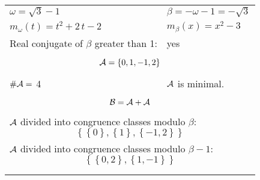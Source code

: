 \begin{exmp}
\label{ex:compareAJ}


\rule{0cm}{0cm}

\begin{tabular}{ll}
$\omega=  \sqrt{3} - 1 $  & $\beta= -\omega - 1 = -\sqrt{3} $\\
$m_\omega(t)=  t^{2} + 2 \, t - 2 $  & $m_\beta(x)=  x^{2} - 3 $\\
Real conjugate of $\beta$ greater than 1:   &  yes \\ \hline
\multicolumn{2}{l}{\begin{minipage}{\textwidth}\begin{dmath*}\A = \left\{0, 1, -1, 2\right\}  \end{dmath*}\end{minipage} }\\
$\#\mathcal{A}= $ 4 $ $ & $\mathcal{A}$ is minimal. \\
\multicolumn{2}{l}{\begin{minipage}{\textwidth}\begin{dmath*}\B =\A+\A \end{dmath*}\end{minipage} }\\[10pt]
\multicolumn{2}{l}{\begin{minipage}{\textwidth}$\mathcal{A}$ divided into congruence classes modulo $\beta$: \begin{dmath*} \left\{\left\{0\right\}, \left\{1\right\}, \left\{-1, 2\right\}\right\}  \end{dmath*}\end{minipage} }\\[10pt]
\multicolumn{2}{l}{\begin{minipage}{\textwidth}$\mathcal{A}$ divided into congruence classes modulo $\beta-1$: \begin{dmath*} \left\{\left\{0, 2\right\}, \left\{1, -1\right\}\right\}  \end{dmath*}\end{minipage} }\\
 & \\ \hline
 & \\
\end{tabular}


\end{exmp}

